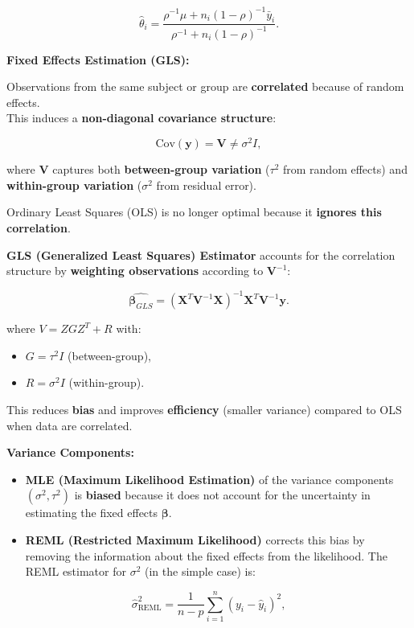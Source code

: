 \documentclass[
  letterpaper,
  DIV=11,
  numbers=noendperiod]{scrreprt}
\providecommand{\tightlist}{%
  \setlength{\itemsep}{0pt}\setlength{\parskip}{0pt}}\usepackage{longtable,booktabs,array}
\begin{document}
\[
\hat{\theta}_i 
= \frac{\rho^{-1} \mu + n_i (1-\rho)^{-1} \bar{y}_i}{\rho^{-1} + n_i (1-\rho)^{-1}}.
\]

\textbf{Fixed Effects Estimation (GLS):}

Observations from the same subject or group are \textbf{correlated}
because of random effects.\\
This induces a \textbf{non-diagonal covariance structure}:

\[
\text{Cov}(\mathbf{y}) = \mathbf{V} \neq \sigma^2 I,
\]

where \(\mathbf{V}\) captures both \textbf{between-group variation}
(\(\tau^2\) from random effects) and \textbf{within-group variation}
(\(\sigma^2\) from residual error).

Ordinary Least Squares (OLS) is no longer optimal because it
\textbf{ignores this correlation}.

\textbf{GLS (Generalized Least Squares) Estimator} accounts for the
correlation structure by \textbf{weighting observations} according to
\(\mathbf{V}^{-1}\):

\[
\widehat{\boldsymbol{\beta}_{GLS}} =
(\mathbf{X}^T \mathbf{V}^{-1} \mathbf{X})^{-1}
\mathbf{X}^T \mathbf{V}^{-1} \mathbf{y}.
\]

where \(V = Z G Z^T + R\) with:

\begin{itemize}
\tightlist
\item
  \(G = \tau^2 I\) (between-group),
\item
  \(R = \sigma^2 I\) (within-group).
\end{itemize}

This reduces \textbf{bias} and improves \textbf{efficiency} (smaller
variance) compared to OLS when data are correlated.

\textbf{Variance Components:}

\begin{itemize}
\item
  \textbf{MLE (Maximum Likelihood Estimation)} of the variance
  components \((\sigma^2, \tau^2)\) is \textbf{biased} because it does
  not account for the uncertainty in estimating the fixed effects
  \(\boldsymbol{\beta}\).
\item
  \textbf{REML (Restricted Maximum Likelihood)} corrects this bias by
  removing the information about the fixed effects from the likelihood.
  The REML estimator for \(\sigma^2\) (in the simple case) is:
\end{itemize}

\[
\hat{\sigma}^2_{\mathrm{REML}} = \frac{1}{n - p} \sum_{i=1}^n (y_i - \hat{y}_i)^2,
\]
\end{document}
